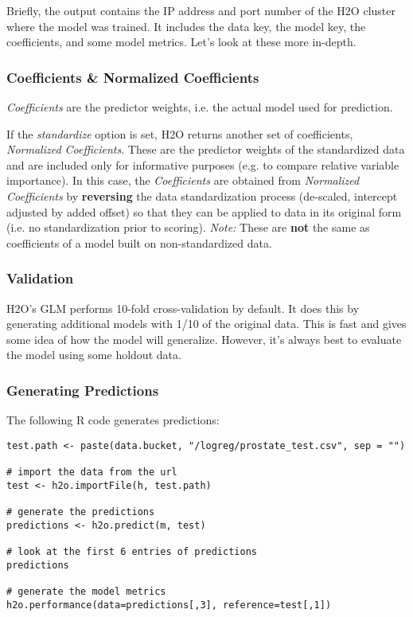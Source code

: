 \documentclass[11pt]{article}
\begin{document}
Briefly, the output contains the IP address and port number of the H2O cluster where the model was trained. It includes the data key, the model key, the coefficients, and  some model metrics. Let's look at these more in-depth.

\subsubsection{Coefficients \& Normalized Coefficients}
\textit{Coefficients} are the predictor weights, i.e. the actual model used for prediction. 

If the \textit{standardize} option is set, H2O returns another set of coefficients, \textit{Normalized Coefficients}. These are the predictor weights of the standardized data and are included only for informative purposes (e.g. to compare relative variable importance). In this case, the \textit{Coefficients} are obtained from \textit{Normalized Coefficients} by \textbf{reversing} the data standardization process (de-scaled, intercept adjusted by added offset) so that they can be applied to data in its original form (i.e. no standardization prior to scoring). \textit{Note:} These are \textbf{not} the same as coefficients of a model built on non-standardized data.

\subsubsection{Validation}

H2O's GLM performs 10-fold cross-validation by default. It does this by generating additional models with 1/10 of the original data. This is fast and gives some idea of how the model will generalize. However, it's always best to evaluate the model using some holdout data.

\subsubsection{Generating Predictions}

The following R code generates predictions:

\begin{verbatim}
test.path <- paste(data.bucket, "/logreg/prostate_test.csv", sep = "")

# import the data from the url
test <- h2o.importFile(h, test.path)

# generate the predictions
predictions <- h2o.predict(m, test)

# look at the first 6 entries of predictions
predictions

# generate the model metrics
h2o.performance(data=predictions[,3], reference=test[,1])
\end{verbatim}
\end{document}
